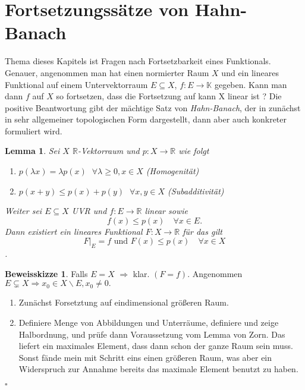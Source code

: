\documentclass[ngerman]{report}
\theoremstyle{plain}%
\newtheorem{lemma}[thm]{Lemma}
\theoremstyle{definition}%
\theoremstyle{myStyle}
\newtheorem*{proof*}{Beweisskizze}
\newenvironment{hinweise}{\footnotesize \begin{proof*}}{\hfill $\square$ \end{proof*}\normalsize}
\newcommand{\R}{\mathbb{R}}
\newcommand{\K}{\mathbb{K}}
\newcommand{\df}[1][]{%
	\overset{#1}{\Rightarrow}
}
\begin{document}
\section{Fortsetzungssätze von Hahn-Banach}
\footnotesize
	Thema dieses Kapitels ist Fragen nach Fortsetzbarkeit eines Funktionals. Genauer, angenommen man hat einen normierter Raum $X$ und ein lineares Funktional auf einem Untervektorraum $E\subseteq X$, $f: E \to \K$ gegeben.
	Kann man dann $f$ auf $X$ so fortsetzen, dass die Fortsetzung auf kann X linear ist ? Die positive Beantwortung gibt der mächtige Satz von \textit{Hahn-Banach}, der in zunächst in sehr allgemeiner topologischen Form dargestellt, dann aber auch konkreter formuliert wird.
\normalsize
	
	\begin{lemma}
		Sei $X$ $\R$-Vektorraum und $p : X \to \R$ wie folgt 
			\begin{enumerate}[1)]
				\item $p(\lambda x) = \lambda p(x)$ $\; \forall \lambda \geq 0, x\in X$ \hfill (Homogenität)
				\item $p(x + y) \leq p(x) + p(y)$ $\; \forall x,y \in X$ \hfill (Subadditivität)
			\end{enumerate}
	 Weiter sei $E \subseteq X$ UVR und $f: E \to \R$ linear sowie 
		 $$f(x) \leq p(x) \quad \forall x \in E.$$ 
	 Dann existiert ein lineares Funktional $F: X\to \R$ für das gilt
		 $$F|_{E} = f \text{ und } F(x) \leq p(x) \quad \forall x \in X$$.
	\end{lemma}

	\begin{hinweise}
		Falls $E = X$ $\df$ klar. $(F = f)$.	
		Angenommen $E \subsetneq X \df x_0 \in X\backslash E, x_0 \neq 0.$
		\begin{enumerate}[1 {Schritt:}]
			\item Zunächst Forsetztung auf eindimensional größeren Raum. 
			\item Definiere Menge von Abbildungen und Unterräume, definiere und zeige Halbordnung, und prüfe dann Voraussetzung vom Lemma von Zorn. 
			Das liefert ein maximales Element, dass dann schon der ganze Raum sein muss. Sonst fände mein mit Schritt eins einen größeren Raum, was aber ein Widerspruch zur Annahme bereits das maximale Element benutzt zu haben. 	
		\end{enumerate}
	\end{hinweise}
\end{document}
